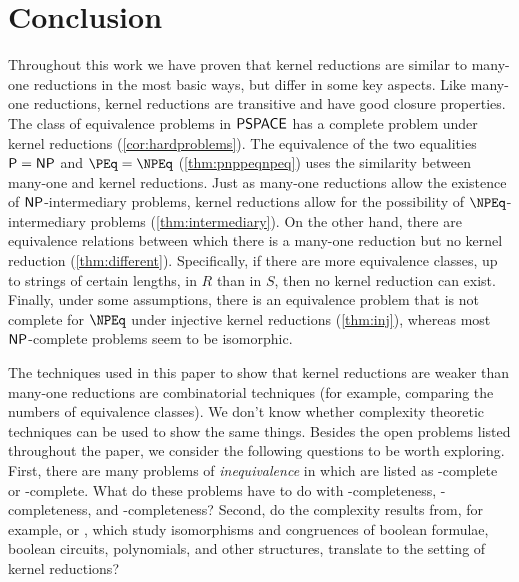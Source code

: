 \section{Conclusion}
%
Throughout this work we have proven that kernel reductions are similar to many-one reductions in the most basic ways, but differ in some key aspects.
Like many-one reductions, kernel reductions are transitive and have good closure properties.
The class of equivalence problems in ${\mathsf{PSPACE}}$ has a complete problem under kernel reductions (\autoref{cor:hardproblems}).
The equivalence of the two equalities ${\mathsf{P}} = {\mathsf{NP}}$ and $\PEq = \NPEq$ (\autoref{thm:pnppeqnpeq}) uses the similarity between many-one and kernel reductions.
Just as many-one reductions allow the existence of ${\mathsf{NP}}$-intermediary problems, kernel reductions allow for the possibility of $\NPEq$-intermediary problems (\autoref{thm:intermediary}).
On the other hand, there are equivalence relations between which there is a many-one reduction but no kernel reduction (\autoref{thm:different}).
Specifically, if there are more equivalence classes, up to strings of certain lengths, in $R$ than in $S$, then no kernel reduction can exist.
Finally, under some assumptions, there is an equivalence problem that is not complete for $\NPEq$ under injective kernel reductions (\autoref{thm:inj}), whereas most ${\mathsf{NP}}$-complete problems seem to be isomorphic.

The techniques used in this paper to show that kernel reductions are weaker than many-one reductions are combinatorial techniques (for example, comparing the numbers of equivalence classes).
We don't know whether complexity theoretic techniques can be used to show the same things.
Besides the open problems listed throughout the paper, we consider the following questions to be worth exploring.
First, there are many problems of \emph{inequivalence} in \autocite{gj79} which are listed as \NP-complete or \PSPACE-complete.
What do these problems have to do with \NPEq-completeness, \coNPEq-completeness, and \PSPACEEq-completeness?
Second, do the complexity results from, for example, \autocite{at96} or \autocite{rs11}, which study isomorphisms and congruences of boolean formulae, boolean circuits, polynomials, and other structures, translate to the setting of kernel reductions?
